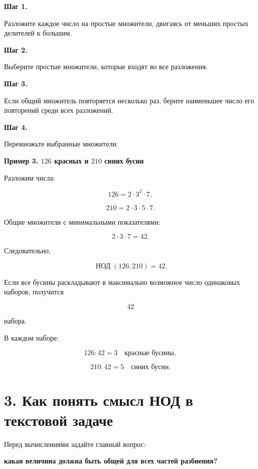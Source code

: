 \documentclass[a4paper,12pt]{article}
\newcommand{\mygcd}[2]{
  \mathop{\text{НОД}}\nolimits(#1,#2)
}
\newcommand{\term}[1]{
  \textbf{\textcolor{darkaccent}{#1}}
}
\newcommand{\exampletitle}[1]{
  \medskip
  \textbf{\textcolor{accent}{#1}}
  \par
  \smallskip
}
\begin{document}
\term{Шаг 1.}
Разложите каждое число на простые множители,
двигаясь от меньших простых делителей к большим.

\term{Шаг 2.}
Выберите простые множители,
которые входят во все разложения.

\term{Шаг 3.}
Если общий множитель повторяется несколько раз,
берите наименьшее число его повторений
среди всех разложений.

\term{Шаг 4.}
Перемножьте выбранные множители.

\exampletitle{
Пример 3. $126$ красных и $210$ синих бусин
}

Разложим числа:

\[
126=2\cdot3^2\cdot7,
\]

\[
210=2\cdot3\cdot5\cdot7.
\]

Общие множители с минимальными показателями:

\[
2\cdot3\cdot7=42.
\]

Следовательно,

\[
\mygcd{126}{210}=42.
\]

Если все бусины раскладывают
в максимально возможное число одинаковых наборов,
получится

\[
42
\]

набора.

В каждом наборе:

\[
126:42=3
\quad
\text{красные бусины},
\]

\[
210:42=5
\quad
\text{синих бусин}.
\]


\section*{3. Как понять смысл НОД в текстовой задаче}

Перед вычислениями задайте главный вопрос:

\begin{center}
\textbf{
какая величина должна быть общей
для всех частей разбиения?
}
\end{center}
\end{document}
